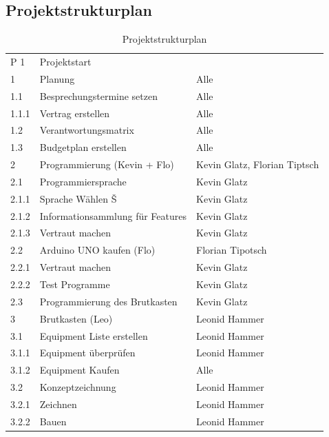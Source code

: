 \subsection{Projektstrukturplan}
\def \currentAuthor{Florian Tipotsch}
\newpage
\begin{table}[H]
	\centering
	\caption{Projektstrukturplan}
	\label{projektstrukturplan}
	\begin{tabular}{lll}
		P 1   & Projektstart                     &                                \\
		1     & Planung                          & Alle                           \\
		1.1   & Besprechungstermine setzen       & Alle                           \\
		1.1.1 & Vertrag erstellen                & Alle                           \\
		1.2   & Verantwortungsmatrix             & Alle                           \\
		1.3   & Budgetplan erstellen             & Alle                           \\
		2     & Programmierung (Kevin + Flo)     & Kevin Glatz, Florian Tiptsch   \\
		2.1   & Programmiersprache               & Kevin Glatz                    \\
		2.1.1 & Sprache Wählen Š                 & Kevin Glatz                    \\
		2.1.2 & Informationsammlung für Features & Kevin Glatz                    \\
		2.1.3 & Vertraut machen                  & Kevin Glatz                    \\
		2.2   & Arduino UNO kaufen (Flo)         & Florian Tipotsch               \\
		2.2.1 & Vertraut machen                  & Kevin Glatz                    \\
		2.2.2 & Test Programme                   & Kevin Glatz                    \\
		2.3   & Programmierung des Brutkasten    & Kevin Glatz                    \\
		3     & Brutkasten (Leo)                 & Leonid Hammer                  \\
		3.1   & Equipment Liste erstellen        & Leonid Hammer                  \\
		3.1.1 & Equipment überprüfen             & Leonid Hammer                  \\
		3.1.2 & Equipment Kaufen                 & Alle                           \\
		3.2   & Konzeptzeichnung                 & Leonid Hammer                  \\
		3.2.1 & Zeichnen                         & Leonid Hammer                  \\
		3.2.2 & Bauen                            & Leonid Hammer                  \\
		

\end{tabular}
\end{table}
